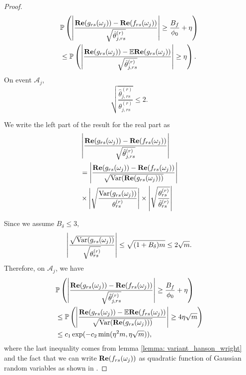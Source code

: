 \begin{proof}
\begin{equation}
\begin{aligned}
& \mathbb{P}\left(\left|\frac{{\bf Re}(g_{rs}(\omega_j)) - {\bf Re}(f_{rs}(\omega_j))}{\sqrt{\hat{\theta}^{(r)}_{j,rs}}}\right| \ge \frac{B_f}{\phi_0}+\eta\right) \\
& \le \mathbb{P}\left(\left|\frac{{\bf Re}(g_{rs}(\omega_j)) - \mathbb{E} {\bf Re}(g_{rs}(\omega_j))}{\sqrt{\hat{\theta}^{(r)}_{j,rs}}}\right| \ge \eta\right) .
\end{aligned}
\end{equation}
On event  $\mathcal{A}_j$, 
\[
\sqrt{\frac{\hat{\theta}^{(r)}_{j, rs}}{\theta^{(r)}_{j, rs}}} \le 2. 
\]

We write the left part of the result for the real part as  
\begin{equation}
\begin{aligned}
& \left|\frac{{\bf Re}(g_{rs}(\omega_j)) - {\bf Re}(f_{rs}(\omega_j))}{\sqrt{\hat{\theta}^{(r)}_{j,rs}}}\right|  \\
& = \left|\frac{{\bf Re}(g_{rs}(\omega_j)) - {\bf Re}(f_{rs}(\omega_j))}{\sqrt{\mathrm{Var}({\bf Re}(g_{rs}(\omega_j)))}}\right|\\
& \times \left|\sqrt{\frac{\mathrm{Var}(g_{rs}(\omega_j))}{\theta^{(r)}_{rs}}}\right| \times \left|\sqrt{\frac{\theta^{(r)}_{rs}}{\hat{\theta}^{(r)}_{rs}}}\right|
\end{aligned}
\end{equation}


Since we assume $B_\delta\le 3$, 
\[
\left|\frac{\sqrt{\mathrm{Var}(g_{rs}(\omega_j))}}{\sqrt{\theta^{(r)}_{rs}}}\right| \le \sqrt{(1+B_\delta)m}\le 2\sqrt{m}. 
\]
Therefore, on $\mathcal{A}_j$, we have 
\begin{equation}
\begin{aligned}
& \mathbb{P}\left(\left|\frac{{\bf Re}(g_{rs}(\omega_j)) - {\bf Re}(f_{rs}(\omega_j))}{\sqrt{\hat{\theta}^{(r)}_{j,rs}}}\right| \ge \frac{B_f}{\phi_0}+\eta\right) \\
& \le \mathbb{P}\left(\left|\frac{{\bf Re}(g_{rs}(\omega_j)) - \mathbb{E} {\bf Re}(f_{rs}(\omega_j))}{\sqrt{\mathrm{Var}({\bf Re}(g_{rs}(\omega_j)))}}\right| \ge 4\eta\sqrt{m} \right)\\
& \le c_1\exp(-c_2\min(\eta^2 m, \eta \sqrt{m})), 
\end{aligned}
\end{equation}
where the last inequality comes from lemma \ref{lemma: variant_hanson_wright} and the fact that we can write 
${\bf Re}(f_{rs}(\omega_j))$ as quadratic function of Gaussian random variables as shown in \cite{sun2018large}. 
\end{proof}



